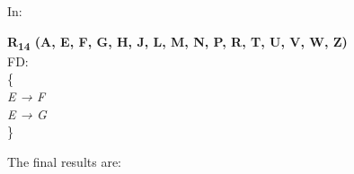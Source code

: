  






In:\\

\begin{adjustwidth}{2cm}{}
\textbf{R\textsubscript{14} (A, E, F, G, H, J, L, M, N, P, R, T, U, V, W, Z)}\\
FD:\\
\{\\
\textit{ 
E → F\\
E → G\\
}
\} \\
\end{adjustwidth} 



The final results are:\\

